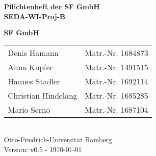 \documentclass[pdftex, a4paper, 12pt]{article}
\begin{document}


\begin{titlepage}

{\sffamily
\vspace*{2cm}
\begin{center}
	\bfseries
	\LARGE {Pflichtenheft der SF GmbH\\SEDA-WI-Proj-B}
\end{center}
\vspace{1cm}
\begin{center}

	{\Large\bfseries SF GmbH\\[5mm]}

	\begin{tabular}{ll}
		Denis Hamann & Matr.-Nr. 1684873 \\[3mm]

		Anna Kupfer & Matr.-Nr.  1491515\\[3mm]

		Hannes Stadler & Matr.-Nr. 1692114 \\[3mm]

		Christian Hindelang & Matr.-Nr. 1685285 \\[3mm]
		
		Mario Serno & Matr.-Nr. 1687104 \\[3mm]


	\end{tabular}\\[0.5cm]
	
{\scriptsize Otto-Friedrich-Universität Bamberg} \\[21pt]


{\footnotesize Version: v0.5 - \today }



\end{center}
}
\end{titlepage}


\newpage

\textcolor{MidnightBlue}{\tableofcontents}

\textcolor{MidnightBlue}{\listoffigures}

\newpage

\newpage

\newpage

\newpage

\newpage

\newpage

\newpage

\newpage

\newpage

\newpage

\newpage

\newpage

\newpage 
%
\end{document}
